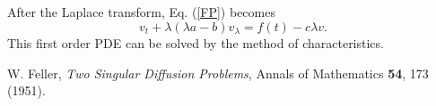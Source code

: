 \documentclass[12pt]{article}
\begin{document}
  After the Laplace transform, Eq. (\ref{FP}) becomes
  \begin{equation}
    v_t + \lambda(\lambda a - b) v_{\lambda} = f(t) - c\lambda v.
  \end{equation}
  This first order PDE can be solved by the method of characteristics.


\begin{thebibliography}{99}
    W. Feller, {\it Two Singular Diffusion Problems}, Annals of Mathematics {\bf 54}, 173 (1951).

\end{thebibliography}
\end{document}
